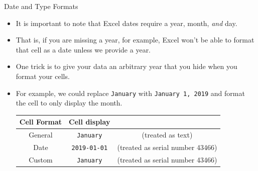 \documentclass[xcolor=svgnames]{beamer}
\begin{document}


\begin{frame}{Date and Type Formats}
\begin{itemize}
\item It is important to note that Excel dates require a year, month, \textit{and} day.
\medskip
\item That is, if you are missing a year, for example, Excel won't be able to format that cell as a date unless we provide a year.
\medskip
\item One trick is to give your data an arbitrary year that you hide when you format your cells.
\medskip
\item For example, we could replace {\tt January} with {\tt January 1, 2019} and format the cell to only display the month. 

\begin{center}
\begin{tabular}{|c|c|c|}
\hline
{\bf Cell Format} & {\bf Cell display}& \\
\hline
General &  {\tt January} & (treated as text) \\
Date & {\tt 2019-01-01} & (treated as  serial number 43466)\\
Custom & {\tt January} & (treated as serial number 43466)\\
\hline\end{tabular}
\end{center}
\end{itemize}
\end{frame}
\end{document}
